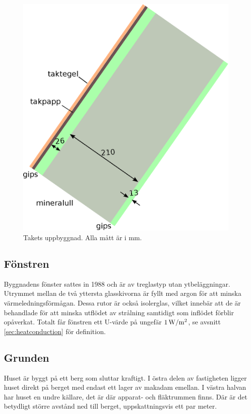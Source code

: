 \begin{figure}[hpbt]
\centering
\includegraphics[width=0.3\textheight]{images/taket.eps}
\caption{\label{fig:taket}{Takets uppbyggnad. Alla mått är i mm.}}
\end{figure}

\subsection{Fönstren}

Byggnadens fönster sattes in 1988 och är av treglastyp utan ytbeläggningar. Utrymmet mellan de två yttersta glasskivorna är fyllt med argon för att minska värmeledningsförmågan. Dessa rutor är också isolerglas, vilket innebär att de är behandlade för att minska utflödet av strålning samtidigt som inflödet förblir opåverkat.  Totalt får fönstren ett U-värde på ungefär $\unit[1]{W/m^2}$, se avsnitt \ref{sec:heatconduction} för definition. 

\subsection{Grunden}

Huset är byggt på ett berg som sluttar kraftigt. I östra delen av fastigheten ligger huset direkt på berget med endast ett lager av makadam emellan\cite{petersarneo}. I västra halvan har huset en undre källare, det är där apparat- och fläktrummen finns. Där är det betydligt större avstånd ned till berget, uppskattningsvis ett par meter. %

